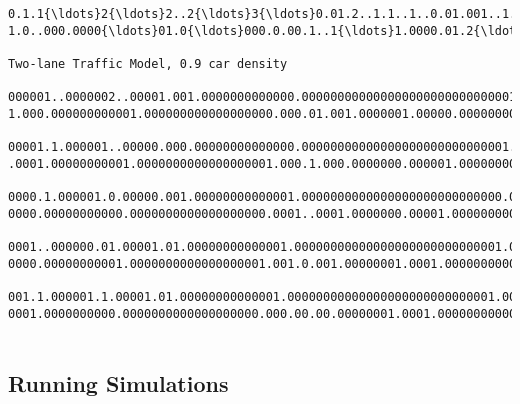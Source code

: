 \documentclass[11pt]{article}
\begin{document}
\begin{Verbatim}[commandchars=\\\{\},fontsize=\footnotesize]
0.1.1{\ldots}2{\ldots}2..2{\ldots}3{\ldots}0.01.2..1.1..1..0.01.001..1.1.000.1.00000001..01{\ldots}1.01.00001..1..00.00
1.0..000.0000{\ldots}01.0{\ldots}000.0.00.1..1{\ldots}1.0000.01.2{\ldots}2{\ldots}0001.1{\ldots}0001.1..0001.1{\ldots}0000001.

Two-lane Traffic Model, 0.9 car density

000001..0000002..00001.001.0000000000000.000000000000000000000000000001.000.00000000000000000000001.
1.000.000000000001.000000000000000000.000.01.001.0000001.00000.0000000000000000000000001.00000000000

00001.1.000001..00000.000.00000000000000.00000000000000000000000000001.0000.0000000000000000000001.0
.0001.00000000001.0000000000000000001.000.1.000.0000000.000001.000000000000000000000001.000000000001

0000.1.000001.0.00000.001.00000000000001.0000000000000000000000000000.00001.000000000000000000000.00
0000.00000000000.0000000000000000000.0001..0001.0000000.00001.000000000000000000000000.000000000000.

0001..000000.01.00001.01.00000000000001.00000000000000000000000000001.0001.0000000000000000000001.00
0000.00000000001.0000000000000000001.001.0.001.00000001.0001.0000000000000000000000000.000000000000.

001.1.000001.1.00001.01.00000000000001.00000000000000000000000000001.0001.0000000000000000000000.000
0001.0000000000.0000000000000000000.000.00.00.00000001.0001.00000000000000000000000001.000000000000.


    \end{Verbatim}

    \subsection{Running Simulations}
\end{document}
